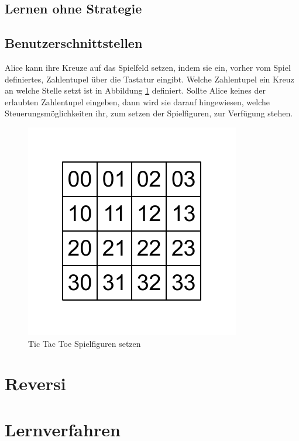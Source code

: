 
\subsection{Lernen ohne Strategie}
\label{subsec:Lernen ohne Strategie}

\subsection{Benutzerschnittstellen}

Alice kann ihre Kreuze auf das Spielfeld setzen, indem sie ein, vorher vom Spiel definiertes, Zahlentupel über die Tastatur eingibt. Welche Zahlentupel ein Kreuz an welche Stelle setzt ist in Abbildung \ref{fig:kreiseUndKreuzeSetzen} definiert. Sollte Alice keines der erlaubten Zahlentupel eingeben, dann wird sie darauf hingewiesen, welche Steuerungsmöglichkeiten ihr, zum setzen der Spielfiguren, zur Verfügung stehen.

\begin{figure}[!htbp]
  \centering
  \includegraphics[scale = 1]{inhalt/abbildungen/vier_mal_vier_matrix.pdf}
  \caption{Tic Tac Toe Spielfiguren setzen}
  \label{fig:kreiseUndKreuzeSetzen}
\end{figure}

\section{Reversi}

\section{Lernverfahren}
\label{sec:lernverfahren}
